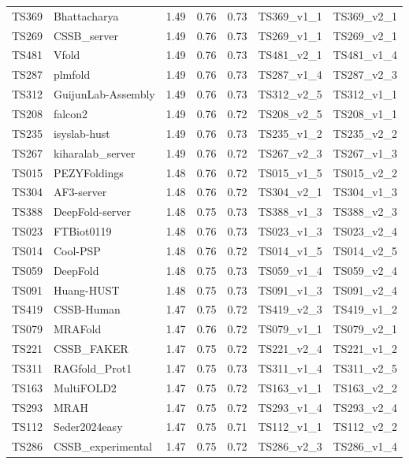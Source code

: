 \begin{longtable}{lllllll}
TS369 & Bhattacharya & 1.49 & 0.76 & 0.73 & TS369\_v1\_1 & TS369\_v2\_1 \\ 
TS269 & CSSB\_server & 1.49 & 0.76 & 0.73 & TS269\_v1\_1 & TS269\_v2\_1 \\ 
TS481 & Vfold & 1.49 & 0.76 & 0.73 & TS481\_v2\_1 & TS481\_v1\_4 \\ 
TS287 & plmfold & 1.49 & 0.76 & 0.73 & TS287\_v1\_4 & TS287\_v2\_3 \\ 
TS312 & GuijunLab-Assembly & 1.49 & 0.76 & 0.73 & TS312\_v2\_5 & TS312\_v1\_1 \\ 
TS208 & falcon2 & 1.49 & 0.76 & 0.72 & TS208\_v2\_5 & TS208\_v1\_1 \\ 
TS235 & isyslab-hust & 1.49 & 0.76 & 0.73 & TS235\_v1\_2 & TS235\_v2\_2 \\ 
TS267 & kiharalab\_server & 1.49 & 0.76 & 0.72 & TS267\_v2\_3 & TS267\_v1\_3 \\ 
TS015 & PEZYFoldings & 1.48 & 0.76 & 0.72 & TS015\_v1\_5 & TS015\_v2\_2 \\ 
TS304 & AF3-server & 1.48 & 0.76 & 0.72 & TS304\_v2\_1 & TS304\_v1\_3 \\ 
TS388 & DeepFold-server & 1.48 & 0.75 & 0.73 & TS388\_v1\_3 & TS388\_v2\_3 \\ 
TS023 & FTBiot0119 & 1.48 & 0.76 & 0.73 & TS023\_v1\_3 & TS023\_v2\_4 \\ 
TS014 & Cool-PSP & 1.48 & 0.76 & 0.72 & TS014\_v1\_5 & TS014\_v2\_5 \\ 
TS059 & DeepFold & 1.48 & 0.75 & 0.73 & TS059\_v1\_4 & TS059\_v2\_4 \\ 
TS091 & Huang-HUST & 1.48 & 0.75 & 0.73 & TS091\_v1\_3 & TS091\_v2\_4 \\ 
TS419 & CSSB-Human & 1.47 & 0.75 & 0.72 & TS419\_v2\_3 & TS419\_v1\_2 \\ 
TS079 & MRAFold & 1.47 & 0.76 & 0.72 & TS079\_v1\_1 & TS079\_v2\_1 \\ 
TS221 & CSSB\_FAKER & 1.47 & 0.75 & 0.72 & TS221\_v2\_4 & TS221\_v1\_2 \\ 
TS311 & RAGfold\_Prot1 & 1.47 & 0.75 & 0.73 & TS311\_v1\_4 & TS311\_v2\_5 \\ 
TS163 & MultiFOLD2 & 1.47 & 0.75 & 0.72 & TS163\_v1\_1 & TS163\_v2\_2 \\ 
TS293 & MRAH & 1.47 & 0.75 & 0.72 & TS293\_v1\_4 & TS293\_v2\_4 \\ 
TS112 & Seder2024easy & 1.47 & 0.75 & 0.71 & TS112\_v1\_1 & TS112\_v2\_2 \\ 
TS286 & CSSB\_experimental & 1.47 & 0.75 & 0.72 & TS286\_v2\_3 & TS286\_v1\_4 \\ 

\end{longtable}
